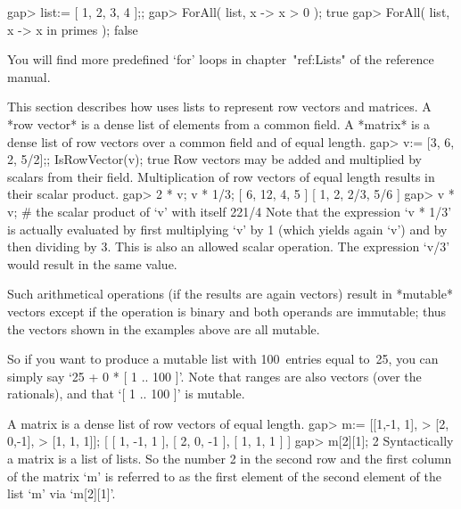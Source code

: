 \beginexample
gap> list:= [ 1, 2, 3, 4 ];;
gap> ForAll( list, x -> x > 0 );
true
gap> ForAll( list, x -> x in primes );
false
\endexample
 
You will find more predefined `for' loops in chapter~"ref:Lists" of the
reference manual.



This section describes how {\GAP} uses lists to represent row vectors and
matrices. A *row vector* is a dense list of elements from a common field.
A *matrix* is a dense list of row vectors over a common field and of
equal length.
\beginexample
gap> v:= [3, 6, 2, 5/2];;  IsRowVector(v);
true
\endexample
Row vectors  may be  added and multiplied   by scalars from  their field.
Multiplication of   row vectors of  equal length  results in their scalar
product.
\beginexample
gap> 2 * v;  v * 1/3;
[ 6, 12, 4, 5 ]
[ 1, 2, 2/3, 5/6 ]
gap> v * v;   # the scalar product of `v' with itself
221/4
\endexample
Note  that   the expression `v   *  1/3' is   actually evaluated by first
multiplying `v' by 1 (which yields again `v')  and by then dividing by 3.
This  is  also an allowed scalar   operation.  The expression `v/3' would
result in  the same value.

Such arithmetical operations (if the results are again vectors)
result in *mutable* vectors except if the operation is binary
and both operands are immutable;
thus the vectors shown in the examples above are all mutable.

So if you want to produce a mutable list with 100~entries equal to~25,
you can simply say `25  + 0 * [ 1 .. 100 ]'.
Note that ranges are also vectors (over the rationals),
and that `[ 1 .. 100 ]' is mutable.


%

A matrix is a dense list of row vectors of equal length.
\beginexample
gap> m:= [[1,-1, 1],
>         [2, 0,-1],
>         [1, 1, 1]];
[ [ 1, -1, 1 ], [ 2, 0, -1 ], [ 1, 1, 1 ] ]
gap> m[2][1];
2
\endexample
Syntactically a matrix is a list of lists. So the number  2 in the second
row  and the first  column of the matrix `m'  is referred to as the first
element of the second element of the list `m' via `m[2][1]'.

